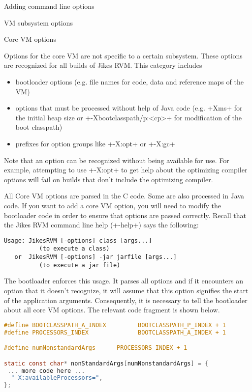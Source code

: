 \begin{section}{Adding command line options}
\begin{subsection}{VM subsystem options}
\end{subsection}

\begin{subsection}{Core VM options}

Options for the core VM are not specific to a certain subsystem. These options are recognized for all builds of Jikes RVM. This category includes
\begin{itemize}
  \item bootloader options (e.g. file names for code, data and reference maps of the VM)
  \item options that must be processed without help of Java code (e.g. \spverb+Xms+ for the initial heap size or \spverb+-Xbootclasspath/p:<cp>+ for modification of the boot classpath)
  \item prefixes for option groups like \spverb+-X:opt+ or \spverb+-X:gc+
\end{itemize}

Note that an option can be recognized without being available for use. For example, attempting to use \spverb+-X:opt+ to get help about the optimizing compiler options will fail on builds that don't include the optimizing compiler.

All Core VM options are parsed in the C code. Some are also processed in Java code. If you want to add a core VM option, you will need to modify the bootloader code in order to ensure that options are passed correctly. Recall that the Jikes RVM command line help (\spverb+-help+) says the following:
\begin{lstlisting}
Usage: JikesRVM [-options] class [args...]
          (to execute a class)
   or  JikesRVM [-options] -jar jarfile [args...]
          (to execute a jar file)
\end{lstlisting}
The bootloader enforces this usage. It parses all options and if it encounters an option that it doesn't recognize, it will assume that this option signifies the start of the application arguments. Consequently, it is necessary to tell the bootloader about all core VM options. The relevant code fragment is shown below.

\begin{lstlisting}[language=C,title=main.c]
#define BOOTCLASSPATH_A_INDEX         BOOTCLASSPATH_P_INDEX + 1
#define PROCESSORS_INDEX              BOOTCLASSPATH_A_INDEX + 1

#define numNonstandardArgs      PROCESSORS_INDEX + 1

static const char* nonStandardArgs[numNonstandardArgs] = {
 ... more code here ...
  "-X:availableProcessors=",
};
\end{lstlisting}


\end{subsection}
\end{section}
